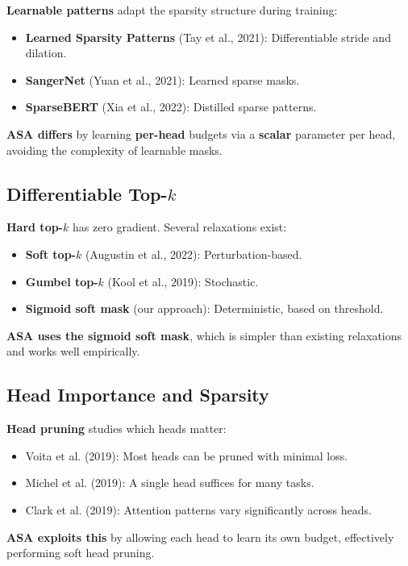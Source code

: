 \textbf{Learnable patterns} adapt the sparsity structure during training:

\begin{itemize}
\item \textbf{Learned Sparsity Patterns} (Tay et al., 2021): Differentiable stride and
  dilation.
\item \textbf{SangerNet} (Yuan et al., 2021): Learned sparse masks.
\item \textbf{SparseBERT} (Xia et al., 2022): Distilled sparse patterns.

\end{itemize}
\textbf{ASA differs} by learning \textbf{per-head} budgets via a \textbf{scalar} parameter 
per head, avoiding the complexity of learnable masks.

\subsection{Differentiable Top-$k$}

\textbf{Hard top-$k$} has zero gradient. Several relaxations exist:

\begin{itemize}
\item \textbf{Soft top-$k$} (Augustin et al., 2022): Perturbation-based.
\item \textbf{Gumbel top-$k$} (Kool et al., 2019): Stochastic.
\item \textbf{Sigmoid soft mask} (our approach): Deterministic, based on threshold.

\end{itemize}
\textbf{ASA uses the sigmoid soft mask}, which is simpler than existing relaxations 
and works well empirically.

\subsection{Head Importance and Sparsity}

\textbf{Head pruning} studies which heads matter:

\begin{itemize}
\item Voita et al. (2019): Most heads can be pruned with minimal loss.
\item Michel et al. (2019): A single head suffices for many tasks.
\item Clark et al. (2019): Attention patterns vary significantly across heads.

\end{itemize}
\textbf{ASA exploits this} by allowing each head to learn its own budget, 
effectively performing soft head pruning.

